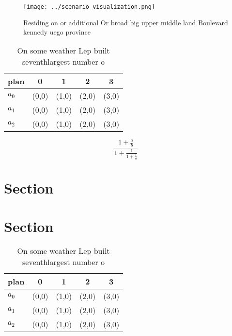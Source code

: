 \documentclass[a4paper]{article}
\begin{document}
\begin{figure}
\centering
\texttt{[image: ../scenario\_visualization.png]}
\caption{Residing on or additional Or broad big upper middle land Boulevard kennedy uego province 
}
\end{figure}
 
\begin{table}
\begin{adjustbox}{width=0.6\columnwidth}
\begin{tabular}{|l|l|l|l|l|}
\hline
\textbf{plan} & \multicolumn{1}{c|}{\textbf{0}} & \multicolumn{1}{c|}{\textbf{1}} & \multicolumn{1}{c|}{\textbf{2}} & \multicolumn{1}{c|}{\textbf{3}} \\ \hline
\textbf{$a_0$}  & (0,0) & (1,0) & (2,0) & (3,0) \\ \hline
\textbf{$a_1$}  & (0,0) & (1,0) & (2,0) & (3,0) \\ \hline
\textbf{$a_2$}  & (0,0) & (1,0) & (2,0) & (3,0) \\ \hline
\end{tabular}
\end{adjustbox}
\caption{On some weather Lep built seventhlargest number o
}
\end{table}

\[ \frac{1+\frac{a}{b}}{1+\frac{1}{1+\frac{1}{a}}} \]

\section{Section}

\section{Section}

\begin{table}
\begin{adjustbox}{width=0.6\columnwidth}
\begin{tabular}{|l|l|l|l|l|}
\hline
\textbf{plan} & \multicolumn{1}{c|}{\textbf{0}} & \multicolumn{1}{c|}{\textbf{1}} & \multicolumn{1}{c|}{\textbf{2}} & \multicolumn{1}{c|}{\textbf{3}} \\ \hline
\textbf{$a_0$}  & (0,0) & (1,0) & (2,0) & (3,0) \\ \hline
\textbf{$a_1$}  & (0,0) & (1,0) & (2,0) & (3,0) \\ \hline
\textbf{$a_2$}  & (0,0) & (1,0) & (2,0) & (3,0) \\ \hline
\end{tabular}
\end{adjustbox}
\caption{On some weather Lep built seventhlargest number o
}
\end{table}
\end{document}
